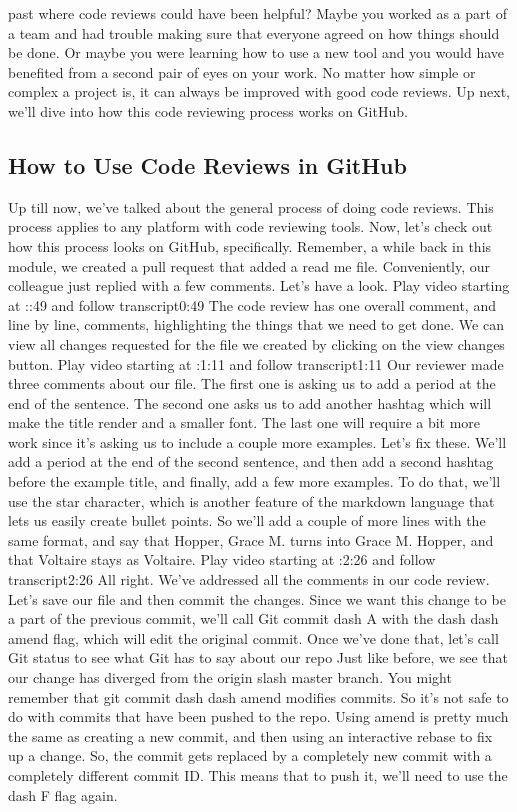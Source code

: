 past where code reviews could have been helpful? Maybe you worked as a part of a team and had trouble making sure that everyone agreed on how things should be done. Or maybe you were learning how to use a new tool and you would have benefited from a second pair of eyes on your work. No matter how simple or complex a project is, it can always be improved with good code reviews. Up next, we'll dive into how this code reviewing process works on GitHub.
	
	\subsection{How to Use Code Reviews in GitHub}
	
	
	Up till now, we've talked about the general process of doing code reviews. This process applies to any platform with code reviewing tools. Now, let's check out how this process looks on GitHub, specifically. Remember, a while back in this module, we created a pull request that added a read me file. Conveniently, our colleague just replied with a few comments. Let's have a look.
	Play video starting at ::49 and follow transcript0:49
	The code review has one overall comment, and line by line, comments, highlighting the things that we need to get done. We can view all changes requested for the file we created by clicking on the view changes button.
	Play video starting at :1:11 and follow transcript1:11
	Our reviewer made three comments about our file. The first one is asking us to add a period at the end of the sentence. The second one asks us to add another hashtag which will make the title render and a smaller font. The last one will require a bit more work since it's asking us to include a couple more examples. Let's fix these. We'll add a period at the end of the second sentence, and then add a second hashtag before the example title, and finally, add a few more examples. To do that, we'll use the star character, which is another feature of the markdown language that lets us easily create bullet points. So we'll add a couple of more lines with the same format, and say that Hopper, Grace M. turns into Grace M. Hopper, and that Voltaire stays as Voltaire.
	Play video starting at :2:26 and follow transcript2:26
	All right. We've addressed all the comments in our code review. Let's save our file and then commit the changes. Since we want this change to be a part of the previous commit, we'll call Git commit dash A with the dash dash amend flag, which will edit the original commit. Once we've done that, let's call Git status to see what Git has to say about our repo Just like before, we see that our change has diverged from the origin slash master branch. You might remember that git commit dash dash amend modifies commits. So it's not safe to do with commits that have been pushed to the repo. Using amend is pretty much the same as creating a new commit, and then using an interactive rebase to fix up a change. So, the commit gets replaced by a completely new commit with a completely different commit ID. This means that to push it, we'll need to use the dash F flag again.
